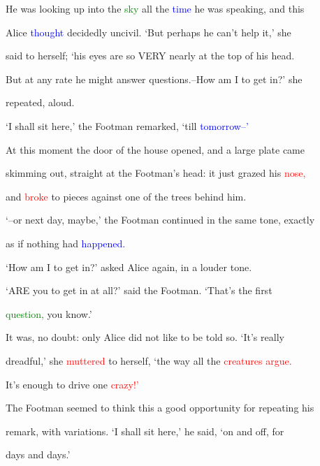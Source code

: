  He was looking up into the \textcolor{green}{sky} all the \textcolor{blue}{time} he was speaking, and this

 Alice \textcolor{blue}{thought} decidedly uncivil. ‘But perhaps he can’t help it,’ she

 said to herself; ‘his eyes are so VERY nearly at the \textcolor{BurntOrange}{top} of his head.

 But at any rate he might answer questions.--How am I to get in?’ she

 repeated, aloud.



 ‘I shall sit here,’ the Footman remarked, ‘till \textcolor{blue}{tomorrow--’}



 At this moment the door of the house opened, and a large plate came

 skimming out, straight at the Footman’s head: it just grazed his \textcolor{red}{nose,}

 and \textcolor{red}{broke} to pieces against one of the \textcolor{BurntOrange}{trees} behind him.



 ‘--or next day, maybe,’ the Footman continued in the same tone, exactly

 as if nothing had \textcolor{blue}{happened.}



 ‘How am I to get in?’ asked Alice again, in a louder tone.



 ‘ARE you to get in at all?’ said the Footman. ‘That’s the first

 \textcolor{green}{question,} you know.’



 It was, no \textcolor{BurntOrange}{doubt:} only Alice did not like to be told so. ‘It’s really

 \textcolor{BurntOrange}{dreadful,’} she \textcolor{red}{muttered} to herself, ‘the way all the \textcolor{red}{creatures} \textcolor{red}{argue.}

 It’s enough to drive one \textcolor{red}{crazy!’}



 The Footman seemed to think this a \textcolor{BurntOrange}{good} \textcolor{BurntOrange}{opportunity} for repeating his

 remark, with variations. ‘I shall sit here,’ he said, ‘on and off, for

 days and days.’



